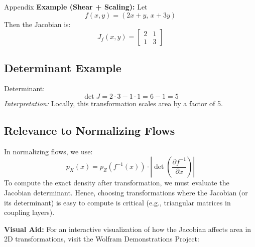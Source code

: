 \begin{frame}[allowframebreaks]{Appendix}
    \vspace{0.5em}
    \textbf{Example (Shear + Scaling):} Let
    \[
    f(x, y) = (2x + y,\, x + 3y)
    \]
    Then the Jacobian is:
    \[
    J_f(x, y) =
    \begin{bmatrix}
    2 & 1 \\
    1 & 3
    \end{bmatrix}
    \]

    \subsection{Determinant Example}
    \label{subsec:appendix-jacobian-determinant}
    Determinant:
    \[
    \det J = 2 \cdot 3 - 1 \cdot 1 = 6 - 1 = 5
    \]
    \textit{Interpretation:} Locally, this transformation scales area by a factor of 5.

    \subsection{Relevance to Normalizing Flows}
    \label{subsec:appendix-jacobian-flows}
    In normalizing flows, we use:
    \[
    p_X(x) = p_Z(f^{-1}(x)) \cdot \left| \det \left( \frac{\partial f^{-1}}{\partial x} \right) \right|
    \]
    To compute the exact density after transformation, we must evaluate the Jacobian determinant. Hence, choosing transformations where the Jacobian (or its determinant) is easy to compute is critical (e.g., triangular matrices in coupling layers).

    \vspace{0.5em}
    \textbf{Visual Aid:} For an interactive visualization of how the Jacobian affects area in 2D transformations, visit the Wolfram Demonstrations Project:
    \begin{center}
      \href{https://demonstrations.wolfram.com/2DJacobian/}{}
    \end{center}    
\end{frame}